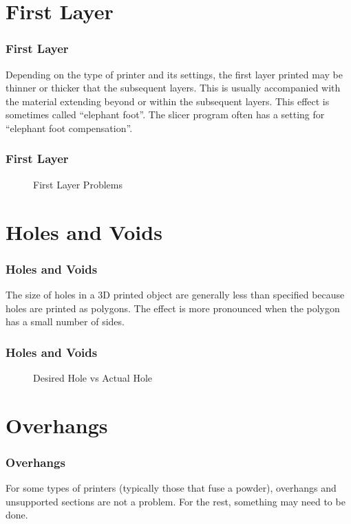 \documentclass[english,10pt]{beamer}
\begin{document}
\section{First Layer}
\begin{frame}
  \frametitle{First Layer}
  Depending on the type of printer and its settings, the first layer printed may be thinner or thicker that the subsequent layers.  This is usually accompanied with the material extending beyond or within the subsequent layers.  This effect is sometimes called ``elephant foot''.  The slicer program often has a setting for ``elephant foot compensation''.
\end{frame}
\begin{frame}
  \frametitle{First Layer}
  \begin{figure}
    
    \caption{First Layer Problems}
  \end{figure}
\end{frame}

\section{Holes and Voids}
\begin{frame}
  \frametitle{Holes and Voids}
  The size of holes in a 3D printed object are generally less than specified because holes are printed as polygons.  The effect is more pronounced when the polygon has a small number of sides.
\end{frame}

\begin{frame}
  \frametitle{Holes and Voids}
  \begin{figure}
    
    \caption{Desired Hole vs Actual Hole}
  \end{figure}
\end{frame}

\section{Overhangs}
\begin{frame}
  \frametitle{Overhangs}
  For some types of printers (typically those that fuse a powder), overhangs and unsupported sections are not a problem.  For the rest, something may need to be done.
\end{frame}

%
%
\end{document}
